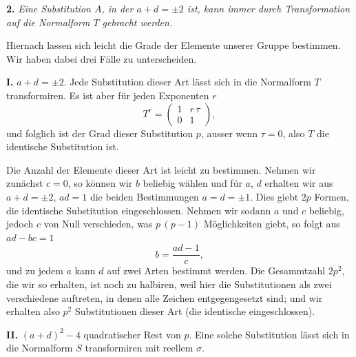 \documentclass[12pt,a4paper]{article}
\begin{document}
\medskip\noindent
\textbf{2.} \emph{Eine Substitution $A$, in der $a + d = \pm 2$ ist, kann immer durch Transformation auf die Normalform $T$ gebracht werden.}

\newpage
{}

Hiernach lassen sich leicht die Grade der Elemente unserer Gruppe bestimmen. Wir haben dabei drei Fälle zu unterscheiden.

\medskip\noindent
\textbf{I.} $a + d = \pm 2$. Jede Substitution dieser Art lässt sich in die Normalform $T$ transformiren. Es ist aber für jeden Exponenten $r$
\[
T^{r} = \begin{pmatrix}1&r\,\tau\\0&1\end{pmatrix},
\]
und folglich ist der Grad dieser Substitution $p$, ausser wenn $\tau = 0$, also $T$ die identische Substitution ist.

Die Anzahl der Elemente dieser Art ist leicht zu bestimmen. Nehmen wir zunächst $c = 0$, so können wir $b$ beliebig wählen und für $a$, $d$ erhalten wir aus $a + d = \pm 2$, $ad = 1$ die beiden Bestimmungen $a = d = \pm 1$. Dies giebt $2p$ Formen, die identische Substitution eingeschlossen. Nehmen wir sodann $a$ und $c$ beliebig, jedoch $c$ von Null verschieden, was $p\,(p-1)$ Möglichkeiten giebt, so folgt aus $ad - bc = 1$
\[
b = \frac{ad - 1}{c},
\]
und zu jedem $a$ kann $d$ auf zwei Arten bestimmt werden. Die Gesammtzahl $2p^{2}$, die wir so erhalten, ist noch zu halbiren, weil hier die Substitutionen als zwei verschiedene auftreten, in denen alle Zeichen entgegengesetzt sind; und wir erhalten also $p^{2}$ Substitutionen dieser Art (die identische eingeschlossen).

\medskip\noindent
\textbf{II.} $(a + d)^{2} - 4$ quadratischer Rest von $p$. Eine solche Substitution lässt sich in die Normalform $S$ transformiren mit reellem $\sigma$.
\end{document}
